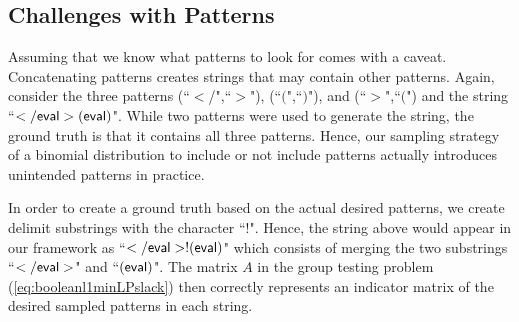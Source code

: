 \subsection{Challenges with Patterns}
Assuming that we know what patterns to look for comes with a caveat. Concatenating patterns creates strings that may contain other patterns. Again, consider the three patterns (``$<$/",``$>$"), (``$($",``$)$"), and (``$>$",``$($") and the string  ``$\sf{</eval>(eval)}$". While two patterns were used to generate the string, the ground truth is that it contains all three patterns. Hence, our sampling strategy of a binomial distribution to include or not include patterns actually introduces unintended patterns in practice. 

In order to create a ground truth based on the actual desired patterns, we create delimit substrings with the character ``$!$".  Hence, the string above would appear in our framework as 
``$\sf{</eval>!(eval)}$" which consists of merging the two substrings ``$\sf{</eval>}$" and ``$\sf{(eval)}$". The matrix $A$ in the group testing problem (\ref{eq:booleanl1minLPslack}) then correctly represents an indicator matrix of the desired sampled patterns in each string.

